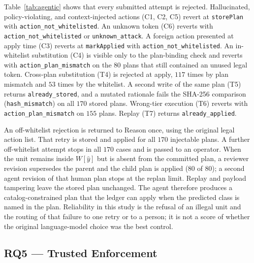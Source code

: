 \documentclass[10pt, conference]{IEEEtran}
\begin{document}
Table~\ref{tab:agentic} shows that every submitted attempt is rejected. Hallucinated, policy-violating, and context-injected actions (C1, C2, C5) revert at \texttt{storePlan} with \texttt{action\_not\_whitelisted}. An unknown token (C6) reverts with \texttt{action\_not\_whitelisted} or \texttt{unknown\_attack}. A foreign action presented at apply time (C3) reverts at \texttt{markApplied} with \texttt{action\_not\_whitelisted}. An in-whitelist substitution (C4) is visible only to the plan-binding check and reverts with \texttt{action\_plan\_mismatch} on the $80$ plans that still contained an unused legal token. Cross-plan substitution (T4) is rejected at apply, $117$ times by plan mismatch and $53$ times by the whitelist. A second write of the same plan (T5) returns \texttt{already\_stored}, and a mutated rationale fails the SHA-256 comparison (\texttt{hash\_mismatch}) on all $170$ stored plans. Wrong-tier execution (T6) reverts with \texttt{action\_plan\_mismatch} on $155$ plans. Replay (T7) returns \texttt{already\_applied}.

An off-whitelist rejection is returned to Reason once, using the original legal action list. That retry is stored and applied for all $170$ injectable plans. A further off-whitelist attempt stops in all $170$ cases and is passed to an operator. When the unit remains inside $W[\hat{y}]$ but is absent from the committed plan, a reviewer revision supersedes the parent and the child plan is applied ($80$ of $80$); a second agent revision of that human plan stops at the replan limit. Replay and payload tampering leave the stored plan unchanged. The agent therefore produces a catalog-constrained plan that the ledger can apply when the predicted class is named in the plan. Reliability in this study is the refusal of an illegal unit and the routing of that failure to one retry or to a person; it is not a score of whether the original language-model choice was the best control.

\subsection{RQ5 --- Trusted Enforcement}
\label{sec:rq5}
\end{document}
